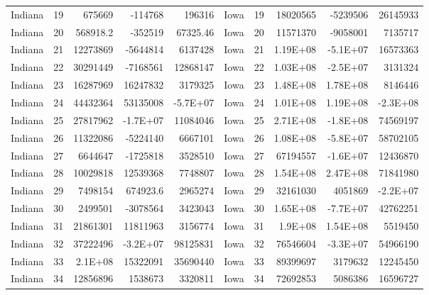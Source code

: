 \begin{table}[]
\begin{tabular}{lrrrrlrrrr}
		Indiana &  19 & 675669 & -114768 & 196316 & Iowa &  19 & 18020565 & -5239506 & 26145933 \\
		Indiana &  20 & 568918.2 & -352519 & 67325.46 & Iowa &  20 & 11571370 & -9058001 & 7135717 \\
		Indiana &  21 & 12273869 & -5644814 & 6137428 & Iowa &  21 & 1.19E+08 & -5.1E+07 & 16573363 \\
		Indiana &  22 & 30291449 & -7168561 & 12868147 & Iowa &  22 & 1.03E+08 & -2.5E+07 & 3131324 \\
		Indiana &  23 & 16287969 & 16247832 & 3179325 & Iowa &  23 & 1.48E+08 & 1.78E+08 & 8146446 \\
		Indiana &  24 & 44432364 & 53135008 & -5.7E+07 & Iowa &  24 & 1.01E+08 & 1.19E+08 & -2.3E+08 \\
		Indiana &  25 & 27817962 & -1.7E+07 & 11084046 & Iowa &  25 & 2.71E+08 & -1.8E+08 & 74569197 \\
		Indiana &  26 & 11322086 & -5224140 & 6667101 & Iowa &  26 & 1.08E+08 & -5.8E+07 & 58702105 \\
		Indiana &  27 & 6644647 & -1725818 & 3528510 & Iowa &  27 & 67194557 & -1.6E+07 & 12436870 \\
		Indiana &  28 & 10029818 & 12539368 & 7748807 & Iowa &  28 & 1.54E+08 & 2.47E+08 & 71841980 \\
		Indiana &  29 & 7498154 & 674923.6 & 2965274 & Iowa &  29 & 32161030 & 4051869 & -2.2E+07 \\
		Indiana &  30 & 2499501 & -3078564 & 3423043 & Iowa &  30 & 1.65E+08 & -7.7E+07 & 42762251 \\
		Indiana &  31 & 21861301 & 11811963 & 3156774 & Iowa &  31 & 1.9E+08 & 1.54E+08 & 5519450 \\
		Indiana &  32 & 37222496 & -3.2E+07 & 98125831 & Iowa &  32 & 76546604 & -3.3E+07 & 54966190 \\
		Indiana &  33 & 2.1E+08 & 15322091 & 35690440 & Iowa &  33 & 89399697 & 3179632 & 12245450 \\
		Indiana &  34 & 12856896 & 1538673 & 3320811 & Iowa &  34 & 72692853 & 5086386 & 16596727
	\end{tabular}
\end{table}


